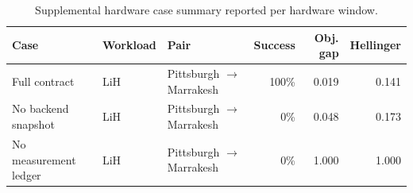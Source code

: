\begin{table}[t]
\centering
{}
\begin{tabular}{lllrrr}
\toprule
Case & Workload & Pair & Success & Obj. gap & Hellinger \\
\midrule
Full contract & LiH & Pittsburgh $\rightarrow$ Marrakesh & 100\% & 0.019 & 0.141 \\
No backend snapshot & LiH & Pittsburgh $\rightarrow$ Marrakesh & 0\% & 0.048 & 0.173 \\
No measurement ledger & LiH & Pittsburgh $\rightarrow$ Marrakesh & 0\% & 1.000 & 1.000 \\
\bottomrule
\end{tabular}
\caption{Supplemental hardware case summary reported per hardware window.}
\label{tab:supplemental\_hw\_case\_summary}
\end{table}
